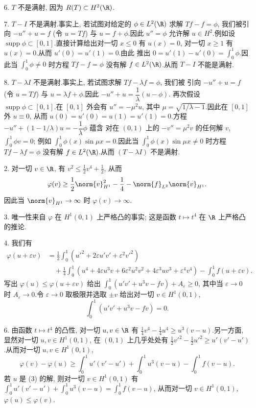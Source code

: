 6. $T$ 不是满射, 因为 $R(T)\subset H^2(\R)$.

7. $T-I$ 不是满射.事实上, 若试图对给定的 $\phi\in L^2(\R)$ 求解 $Tf-f=\phi$,
我们被引向 $-u''+u=f$ (令 $u=Tf$) 与 $u=f+\phi$.因此 $u''=\phi$ 允许解
$u\in H^2$.例如设 $\operatorname{supp}\phi\subset[0,1]$.直接计算给出对一切
$x\le0$ 有 $u(x)=0$, 对一切 $x\ge1$ 有 $u(x)=0$.从而 $u'(0)=u'(1)=0$.由此
推出 $0=u'(1)-u'(0)=\int_0^1\phi$.因此当 $\int_0^1\phi\ne0$ 时方程 $Tf-f=\phi$
没有解 $f\in L^2(\R)$.从而 $T-I$ 不能是满射.

8. $T-\lambda I$ 不是满射.事实上, 若试图求解 $Tf-\lambda f=\phi$, 我们被
引向 $-u''+u=f$ (令 $u=Tf$) 与 $u=\lambda f+\phi$.因此 $-u''+u=\dfrac1\lambda(u-\phi)$.
再次假设 $\operatorname{supp}\phi\subset[0,1]$.在 $[0,1]$ 外会有 $u''=-\mu^2u$,
其中 $\mu=\sqrt{1/\lambda-1}$.因此在 $[0,1]$ 外 $u\equiv0$, 从而
$u(0)=u'(0)=u(1)=u'(1)=0$.方程 $-u''+(1-1/\lambda)u=-\dfrac1\lambda\phi$ 蕴含
对在 $(0,1)$ 上的 $-v''=\mu^2v$ 的任何解 $v$, $\int_0^1\phi v=0$; 例如
$\int_0^1\phi(x)\sin\mu x=0$.因此当 $\int_0^1\phi(x)\sin\mu x\ne0$ 时方程
$Tf-\lambda f=\phi$ 没有解 $f\in L^2(\R)$.从而 $(T-\lambda I)$ 不是满射.


2. 对一切 $v\in\R$, 有 $v^2\le\frac12v^4+\frac12$, 从而
\begin{equation*}
\varphi(v)\ge\frac12\norm{v}_{H^1}^2-\frac14-\norm{f}_{L^2}\norm{v}_{H^1}.
\end{equation*}
因此当 $\norm{v}_{H^1}\to\infty$ 时 $\varphi(v)\to\infty$.

3. 唯一性来自 $\varphi$ 在 $H^1(0,1)$ 上严格凸的事实; 这是函数 $t\mapsto t^4$
在 $\R$ 上严格凸的推论.

4. 我们有
\begin{align*}
\varphi(u+\varepsilon v)&=\frac12\int_0^1(u'^2+2\varepsilon u'v'+\varepsilon^2v'^2)\\
&\quad+\frac14\int_0^1(u^4+4\varepsilon u^3v+6\varepsilon^2u^2v^2+4\varepsilon^3uv^3+\varepsilon^4v^4)-\int_0^1f(u+\varepsilon v).
\end{align*}
写出 $\varphi(u)\le\varphi(u+\varepsilon v)$ 给出
$\int_0^1(u'v'+u^3v-fv)+A_\varepsilon\ge0$, 其中当 $\varepsilon\to0$ 时
$A_\varepsilon\to0$.令 $\varepsilon\to0$ 取极限并选取 $\pm v$ 给出对一切
$v\in H^1(0,1)$,
\begin{equation*}
\int_0^1(u'v'+u^3v-fv)=0.
\end{equation*}

6. 由函数 $t\mapsto t^4$ 的凸性, 对一切 $u,v\in\R$ 有
$\frac14v^4-\frac14u^4\ge u^3(v-u)$.另一方面, 显然对一切 $u,v\in H^1(0,1)$,
在 $(0,1)$ 上几乎处处有 $\frac12v'^2-\frac12u'^2\ge u'(v'-u')$.从而对一切
$u,v\in H^1(0,1)$,
\begin{equation*}
\varphi(v)-\varphi(u)\ge\int_0^1u'(v'-u')+\int_0^1u^3(v-u)-\int_0^1f(v-u).
\end{equation*}
若 $u$ 是 (3) 的解, 则对一切 $v\in H^1(0,1)$ 有
$\int_0^1u'(v'-u')+\int_0^1u^3(v-u)=\int_0^1f(v-u)$, 从而对一切
$v\in H^1(0,1)$, $\varphi(u)\le\varphi(v)$.

